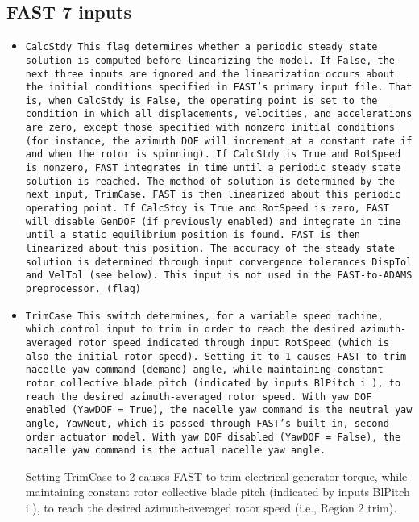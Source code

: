\documentclass[11pt]{article}
\begin{document}
\subsection{FAST 7 inputs}
\begin{itemize}\tightlist
    \item \tt{CalcStdy} This flag determines whether a periodic steady state solution is computed before linearizing the
model. If False, the next three inputs are ignored and the linearization occurs about the initial
conditions specified in FAST’s primary input file. That is, when CalcStdy is False, the operating
point is set to the condition in which all displacements, velocities, and accelerations are zero,
except those specified with nonzero initial conditions (for instance, the azimuth DOF will
increment at a constant rate if and when the rotor is spinning). If CalcStdy is True and
RotSpeed is nonzero, FAST integrates in time until a periodic steady state solution is reached.
The method of solution is determined by the next input, TrimCase. FAST is then linearized
about this periodic operating point. If CalcStdy is True and RotSpeed is zero, FAST will
disable GenDOF (if previously enabled) and integrate in time until a static equilibrium position is
found. FAST is then linearized about this position. The accuracy of the steady state solution is
determined through input convergence tolerances DispTol and VelTol (see below). This input is
not used in the FAST-to-ADAMS preprocessor. (flag)

\item \tt{TrimCase} This switch determines, for a variable speed machine, which control input to trim in order to reach
the desired azimuth-averaged rotor speed indicated through input RotSpeed (which is also the
initial rotor speed). 
 Setting it to 1 causes FAST to trim nacelle yaw command (demand) angle,
while maintaining constant rotor collective blade pitch (indicated by inputs BlPitch i ), to reach the
desired azimuth-averaged rotor speed. With yaw DOF enabled (YawDOF = True), the nacelle
yaw command is the neutral yaw angle, YawNeut, which is passed through FAST’s built-in,
second-order actuator model. With yaw DOF disabled (YawDOF = False), the nacelle yaw
command is the actual nacelle yaw angle. 

Setting TrimCase to 2 causes FAST to trim electrical
generator torque, while maintaining constant rotor collective blade pitch (indicated by inputs
BlPitch i ), to reach the desired azimuth-averaged rotor speed (i.e., Region 2 trim). 


\end{itemize}
\end{document}
